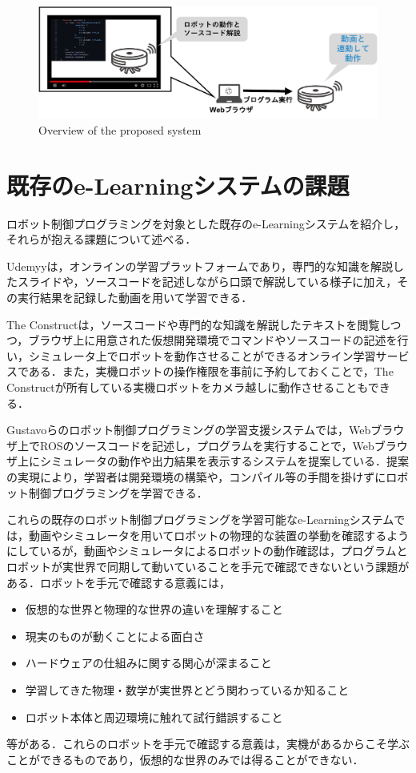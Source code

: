 \documentclass{ujarticle}
\begin{document}
\begin{figure}[t]
  \centering
  \includegraphics[keepaspectratio, scale=0.3]{./src/Proposal_system_ab.pdf}
  \caption{Overview of the proposed system}
  \label{fig:Proposal_system_ab}
\end{figure}

\section{既存のe-Learningシステムの課題}
ロボット制御プログラミングを対象とした既存のe-Learningシステムを紹介し，それらが抱える課題について述べる．
\par Udemyy\cite{Udemy}は，オンラインの学習プラットフォームであり，専門的な知識を解説したスライドや，ソースコードを記述しながら口頭で解説している様子に加え，その実行結果を記録した動画を用いて学習できる．
\par The Construct\cite{Construct}は，ソースコードや専門的な知識を解説したテキストを閲覧しつつ，ブラウザ上に用意された仮想開発環境でコマンドやソースコードの記述を行い，シミュレータ上でロボットを動作させることができるオンライン学習サービスである．また，実機ロボットの操作権限を事前に予約しておくことで，The Constructが所有している実機ロボットをカメラ越しに動作させることもできる．
\par Gustavoらのロボット制御プログラミングの学習支援システム\cite{Gustavo}では，Webブラウザ上でROSのソースコードを記述し，プログラムを実行することで，Webブラウザ上にシミュレータの動作や出力結果を表示するシステムを提案している．提案の実現により，学習者は開発環境の構築や，コンパイル等の手間を掛けずにロボット制御プログラミングを学習できる．
\par これらの既存のロボット制御プログラミングを学習可能なe-Learningシステムでは，動画やシミュレータを用いてロボットの物理的な装置の挙動を確認するようにしているが，動画やシミュレータによるロボットの動作確認は，プログラムとロボットが実世界で同期して動いていることを手元で確認できないという課題がある．ロボットを手元で確認する意義には，
\begin{itemize}
  \item 仮想的な世界と物理的な世界の違いを理解すること
  \item 現実のものが動くことによる面白さ
  \item ハードウェアの仕組みに関する関心が深まること
  \item 学習してきた物理・数学が実世界とどう関わっているか知ること
  \item ロボット本体と周辺環境に触れて試行錯誤すること
\end{itemize}
等がある．これらのロボットを手元で確認する意義は，実機があるからこそ学ぶことができるものであり，仮想的な世界のみでは得ることができない．
\end{document}
